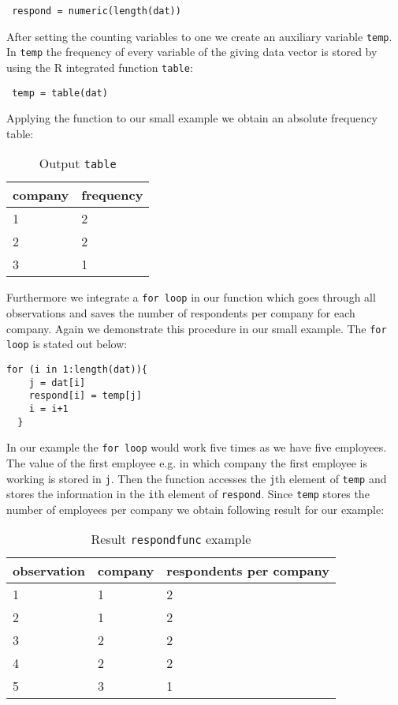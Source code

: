 \lstset{firstnumber = 19}
\begin{lstlisting}
 respond = numeric(length(dat))
\end{lstlisting}
After setting the counting variables to one we create an auxiliary variable \texttt{temp}. In \texttt{temp} the frequency of every variable of the giving data vector is stored by using the R integrated function \texttt{table}:
\lstset{firstnumber = 22}
\begin{lstlisting}
 temp = table(dat) 
 \end{lstlisting}
Applying the function to our small example we obtain an absolute frequency table:
 \begin{table}[h!]
\centering
\caption{Output \texttt{table}}
\label{my-label}
\begin{tabular}{|l|l|}
\hline
company & frequency \\ \hline
1       & 2         \\ \hline
2       & 2         \\ \hline
3       & 1         \\ \hline
\end{tabular}
\end{table}

Furthermore we integrate a \texttt{for loop} in our function which goes through all observations and saves the number of respondents per company for each company. Again we demonstrate this procedure in our small example. The \texttt{for loop} is stated out below:
\lstset{firstnumber = 23}
\begin{lstlisting}
for (i in 1:length(dat)){                 
    j = dat[i]                           
    respond[i] = temp[j]                  
    i = i+1              
  } \end{lstlisting}
In our example the \texttt{for loop} would work five times as we have five employees. The value of the first employee e.g. in which company the first employee is working is stored in \texttt{j}. Then the function accesses the \texttt{j}th element of \texttt{temp} and stores the information in the \texttt{i}th element of \texttt{respond}. Since \texttt{temp} stores the number of employees per company we obtain following result for our example:
\begin{table}[h!]
\centering
\caption{Result \texttt{respondfunc} example}
\label{my-label}
\begin{tabular}{|l|l|l|}
\hline
observation & company & respondents per company \\ \hline
1           & 1       & 2                       \\ \hline
2           & 1       & 2                       \\ \hline
3           & 2       & 2                       \\ \hline
4           & 2       & 2                       \\ \hline
5           & 3       & 1                       \\ \hline
\end{tabular}
\end{table}


